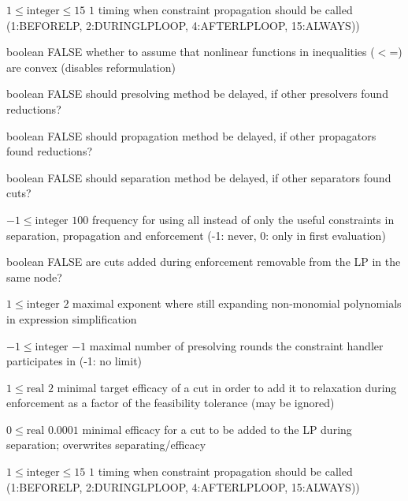 %
{$1\leq\textrm{integer}\leq15$}%
{$1$}%
{timing when constraint propagation should be called (1:BEFORELP, 2:DURINGLPLOOP, 4:AFTERLPLOOP, 15:ALWAYS))}%
{}

%
{boolean}%
{FALSE}%
{whether to assume that nonlinear functions in inequalities ($<$=) are convex (disables reformulation)}%
{}

%
{boolean}%
{FALSE}%
{should presolving method be delayed, if other presolvers found reductions?}%
{}

%
{boolean}%
{FALSE}%
{should propagation method be delayed, if other propagators found reductions?}%
{}

%
{boolean}%
{FALSE}%
{should separation method be delayed, if other separators found cuts?}%
{}

%
{$-1\leq\textrm{integer}$}%
{$100$}%
{frequency for using all instead of only the useful constraints in separation, propagation and enforcement (-1: never, 0: only in first evaluation)}%
{}

%
{boolean}%
{FALSE}%
{are cuts added during enforcement removable from the LP in the same node?}%
{}

%
{$1\leq\textrm{integer}$}%
{$2$}%
{maximal exponent where still expanding non-monomial polynomials in expression simplification}%
{}

%
{$-1\leq\textrm{integer}$}%
{$-1$}%
{maximal number of presolving rounds the constraint handler participates in (-1: no limit)}%
{}

%
{$1\leq\textrm{real}$}%
{$2$}%
{minimal target efficacy of a cut in order to add it to relaxation during enforcement as a factor of the feasibility tolerance (may be ignored)}%
{}

%
{$0\leq\textrm{real}$}%
{$0.0001$}%
{minimal efficacy for a cut to be added to the LP during separation; overwrites separating/efficacy}%
{}

%
{$1\leq\textrm{integer}\leq15$}%
{$1$}%
{timing when constraint propagation should be called (1:BEFORELP, 2:DURINGLPLOOP, 4:AFTERLPLOOP, 15:ALWAYS))}%
{}

